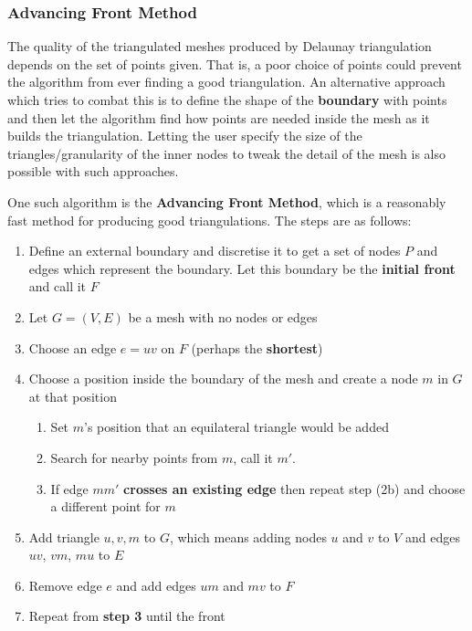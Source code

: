 \documentclass{article}
\begin{document}
\subsubsection{Advancing Front Method}

The quality of the triangulated meshes produced by Delaunay triangulation depends on the set of points given. That is, a poor choice of points could prevent the algorithm from ever finding a good triangulation. An alternative approach which tries to combat this is to define the shape of the \textbf{boundary} with points and then let the algorithm find how points are needed inside the mesh as it builds the triangulation. Letting the user specify the size of the triangles/granularity of the inner nodes to tweak the detail of the mesh is also possible with such approaches.

One such algorithm is the \textbf{Advancing Front Method}, which is a reasonably fast method for producing good triangulations. The steps are as follows:
\begin{enumerate}
	\item Define an external boundary and discretise it to get a set of nodes $P$ and edges which represent the boundary. Let this boundary be the \textbf{initial front} and call it $F$
	\item Let $G = (V, E)$ be a mesh with no nodes or edges
	\item Choose an edge $e = uv$ on $F$ (perhaps the \textbf{shortest})
	\item Choose a position inside the boundary of the mesh and create a node $m$ in $G$ at that position
	\begin{enumerate}
		\item Set $m$'s position that an equilateral triangle would be added
		\item Search for nearby points from $m$, call it $m'$.
		\item If edge $mm'$ \textbf{crosses an existing edge} then repeat step (2b) and choose a different point for $m$
	\end{enumerate}
	\item Add triangle $u,v,m$ to $G$, which means adding nodes $u$ and $v$ to $V$ and edges $uv$, $vm$, $mu$ to $E$
	\item Remove edge $e$ and add edges $um$ and $mv$ to $F$
	\item Repeat from \textbf{step 3} until the front 
\end{enumerate}
\end{document}
